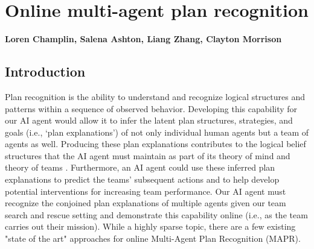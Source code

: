 \chapter{Online multi-agent plan recognition}
\label{ch:plan_recognition}
\textbf{Loren Champlin, Salena Ashton, Liang Zhang, Clayton Morrison}

\section{Introduction}

Plan recognition is the ability to understand and recognize logical structures
and patterns within a sequence of observed behavior. Developing this capability
for our AI agent would allow it to infer the latent plan structures,
strategies, and goals (i.e., `plan explanations') of not only individual human
agents but a team of agents as well. Producing these plan explanations
contributes to the logical belief structures that the AI agent must maintain as
part of its theory of mind and theory of teams
\citep{Tambe_1997,Baker_Tenenbaum_2014}. Furthermore, an AI agent could use
these inferred plan explanations to predict the teams' subsequent actions and
to help develop potential interventions for increasing team performance. Our AI
agent must recognize the conjoined plan explanations of multiple agents given
our team search and rescue setting and demonstrate this capability online
(i.e., as the team carries out their mission). While a highly sparse topic,
there are a few existing "state of the art" approaches for online Multi-Agent
Plan Recognition (MAPR). 


